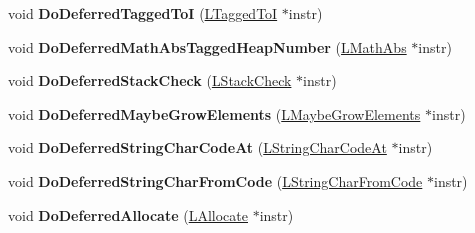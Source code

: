 \begin{DoxyCompactItemize}
\item 
void {\bfseries Do\+Deferred\+Tagged\+ToI} (\hyperlink{classv8_1_1internal_1_1_l_tagged_to_i}{L\+Tagged\+ToI} $\ast$instr)\hypertarget{classv8_1_1internal_1_1_l_code_gen_a64133c7509f54dc0bd30c3bbb07db4ad}{}\label{classv8_1_1internal_1_1_l_code_gen_a64133c7509f54dc0bd30c3bbb07db4ad}

\item 
void {\bfseries Do\+Deferred\+Math\+Abs\+Tagged\+Heap\+Number} (\hyperlink{classv8_1_1internal_1_1_l_math_abs}{L\+Math\+Abs} $\ast$instr)\hypertarget{classv8_1_1internal_1_1_l_code_gen_aa6e5b6dba176a4572ce81dcc27b057aa}{}\label{classv8_1_1internal_1_1_l_code_gen_aa6e5b6dba176a4572ce81dcc27b057aa}

\item 
void {\bfseries Do\+Deferred\+Stack\+Check} (\hyperlink{classv8_1_1internal_1_1_l_stack_check}{L\+Stack\+Check} $\ast$instr)\hypertarget{classv8_1_1internal_1_1_l_code_gen_a273730f2504ea249d9deb8dde7b314ee}{}\label{classv8_1_1internal_1_1_l_code_gen_a273730f2504ea249d9deb8dde7b314ee}

\item 
void {\bfseries Do\+Deferred\+Maybe\+Grow\+Elements} (\hyperlink{classv8_1_1internal_1_1_l_maybe_grow_elements}{L\+Maybe\+Grow\+Elements} $\ast$instr)\hypertarget{classv8_1_1internal_1_1_l_code_gen_afe319c35fc8adaff35f3417fb7c833d6}{}\label{classv8_1_1internal_1_1_l_code_gen_afe319c35fc8adaff35f3417fb7c833d6}

\item 
void {\bfseries Do\+Deferred\+String\+Char\+Code\+At} (\hyperlink{classv8_1_1internal_1_1_l_string_char_code_at}{L\+String\+Char\+Code\+At} $\ast$instr)\hypertarget{classv8_1_1internal_1_1_l_code_gen_a6b229168338a73ef11c203f845b68cb4}{}\label{classv8_1_1internal_1_1_l_code_gen_a6b229168338a73ef11c203f845b68cb4}

\item 
void {\bfseries Do\+Deferred\+String\+Char\+From\+Code} (\hyperlink{classv8_1_1internal_1_1_l_string_char_from_code}{L\+String\+Char\+From\+Code} $\ast$instr)\hypertarget{classv8_1_1internal_1_1_l_code_gen_acf78c92290237e368a4b178f049afbc6}{}\label{classv8_1_1internal_1_1_l_code_gen_acf78c92290237e368a4b178f049afbc6}

\item 
void {\bfseries Do\+Deferred\+Allocate} (\hyperlink{classv8_1_1internal_1_1_l_allocate}{L\+Allocate} $\ast$instr)\hypertarget{classv8_1_1internal_1_1_l_code_gen_a5a708933d9b086e295c8bf902f66033e}{}\label{classv8_1_1internal_1_1_l_code_gen_a5a708933d9b086e295c8bf902f66033e}


\end{DoxyCompactItemize}
